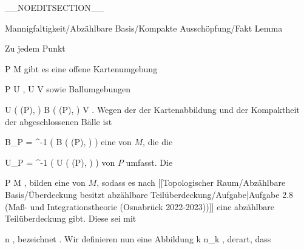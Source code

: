 
__NOEDITSECTION__

{Mannigfaltigkeit/Abzählbare Basis/Kompakte Ausschöpfung/Fakt}
{Lemma}
{}
{

\faktzusatz {}
\faktzusatz {}

}
{

Zu jedem Punkt

\mavergleichskette
{\vergleichskette
{ P
}
{ \in }{ M
}
{  }{
}
{    }{
}
{   }{
}
}
{}{}{}
gibt es eine offene Kartenumgebung

\mavergleichskette
{\vergleichskette
{ P
}
{ \in }{ U
}
{  }{
}
{    }{
}
{   }{
}
}
{}{}{,}
\maabbdisp {\alpha} { U } { V
} {}
sowie Ballumgebungen

\mavergleichskettedisp
{\vergleichskette
{ U \left(  \alpha(P), \epsilon  \right)
}
{ \subseteq} { B  \left( \alpha(P), \epsilon \right)
}
{ \subset} { V
}
{ } {
}
{ } {
}
}
{}{}{.}
Wegen der
der Kartenabbildung und der Kompaktheit der abgeschlossenen Bälle ist

\mavergleichskette
{\vergleichskette
{ B_P
}
{ = }{ \alpha^{-1} \left(  B  \left( \alpha(P), \epsilon \right)  \right)
}
{  }{
}
{    }{
}
{   }{
}
}
{}{}{}
eine
von $M$, die die

\mavergleichskette
{\vergleichskette
{ U_P
}
{ = }{ \alpha^{-1} \left(  U \left(  \alpha(P), \epsilon  \right)  \right)
}
{  }{
}
{    }{
}
{   }{
}
}
{}{}{}
von $P$ umfasst. Die

 {}
 {P \in M} {}
 {} {} {} {,}
bilden eine
von $M$, sodass es nach
[[Topologischer Raum/Abzählbare Basis/Überdeckung besitzt abzählbare Teilüberdeckung/Aufgabe|Aufgabe 2.8 (Maß- und Integrationstheorie (Osnabrück 2022-2023))]]
eine abzählbare Teilüberdeckung gibt. Diese sei mit

 {}
 {n \in \N} {}
 {} {} {} {,}
bezeichnet
 {} {.}
Wir definieren nun
eine
Abbildung
\maabbeledisp {} {\N} {\N
} { k } {n_k
} {,}
derart, dass

}
